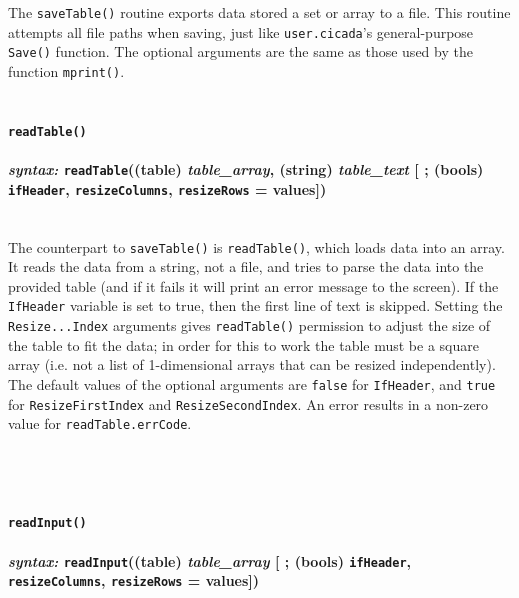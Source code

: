 \documentclass{article}
\begin{document}
The \texttt{saveTable()} routine exports data stored a set or array to a file.  This routine attempts all file paths when saving, just like \verb#user.cicada#'s general-purpose \verb#Save()# function.  The optional arguments are the same as those used by the function \texttt{mprint()}.\\\\



\paragraph{\texttt{readTable()}\\\\
\normalfont \emph{syntax: } \texttt{readTable}((table) \emph{table\_array}, (string) \emph{table\_text} [ ; (bools) \texttt{ifHeader}, \texttt{resizeColumns}, \texttt{resizeRows} = values])\\\\}

The counterpart to \texttt{saveTable()} is \texttt{readTable()}, which loads data into an array.  It reads the data from a string, not a file, and tries to parse the data into the provided table (and if it fails it will print an error message to the screen).  If the \texttt{IfHeader} variable is set to true, then the first line of text is skipped.  Setting the \texttt{Resize...Index} arguments gives \verb#readTable()# permission to adjust the size of the table to fit the data; in order for this to work the table must be a square array (i.e. not a list of 1-dimensional arrays that can be resized independently).  The default values of the optional arguments are \texttt{false} for \texttt{IfHeader}, and \texttt{true} for \texttt{ResizeFirstIndex} and \texttt{ResizeSecondIndex}.  An error results in a non-zero value for \verb#readTable.errCode#.\\\\\\\\



\paragraph{\texttt{readInput()}\\\\
\normalfont \emph{syntax: } \texttt{readInput}((table) \emph{table\_array} [ ; (bools) \texttt{ifHeader}, \texttt{resizeColumns}, \texttt{resizeRows} = values])\\\\}
\end{document}

